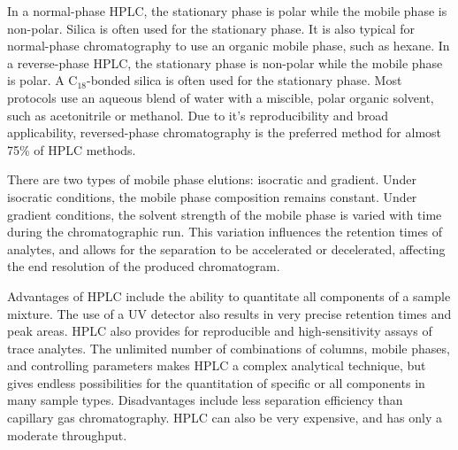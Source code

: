 \documentclass{article}
\begin{document}
\begin{multicols}{2}
{    In a normal-phase HPLC, the stationary phase is polar while the mobile phase
    is non-polar. Silica is often used for the stationary phase. It is also
    typical for normal-phase chromatography to use an organic mobile phase, such
    as hexane.  
    In a reverse-phase HPLC, the stationary phase is non-polar while
    the mobile phase is polar. A C$_{18}$-bonded silica is often used
    for the stationary phase.  Most protocols use an aqueous blend of water with
    a miscible, polar organic solvent, such as acetonitrile or methanol. 
    Due to it's reproducibility and broad
    applicability, reversed-phase chromatography is the preferred method for
    almost 75\% of HPLC methods. \cite{waters}

    There are two types of mobile phase elutions: isocratic and gradient. Under
    isocratic conditions, the mobile phase composition remains constant. Under
    gradient conditions, the solvent strength of the mobile phase is varied
    with time during the chromatographic run. This variation influences the
    retention times of analytes, and allows for the separation to be accelerated
    or decelerated, affecting the end resolution of the produced chromatogram.

    Advantages of HPLC include the ability to quantitate all components of a
    sample mixture. The use of a UV detector also results in very precise retention
    times and peak areas. HPLC also provides for reproducible and
    high-sensitivity assays of trace analytes. 
    The unlimited number of combinations of columns, mobile phases, and
    controlling parameters makes HPLC a complex analytical technique, but gives
    endless possibilities for the quantitation of specific or all components in
    many sample types.
    Disadvantages include less separation efficiency than capillary gas
    chromatography. HPLC can also be very expensive, and has only a moderate
    throughput. \cite{dong}

}
\end{multicols}
\end{document}
